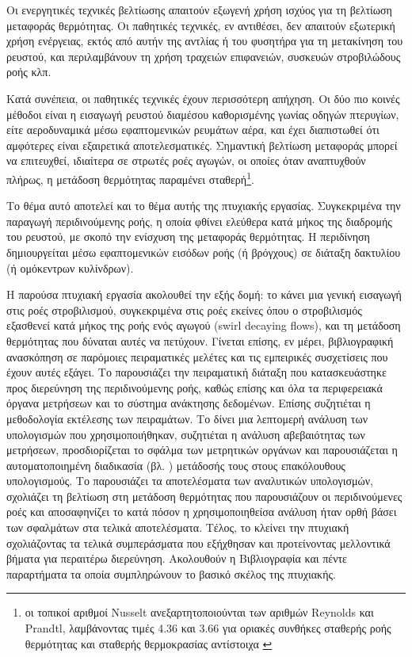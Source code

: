 Οι ενεργητικές τεχνικές βελτίωσης απαιτούν εξωγενή χρήση ισχύος για τη βελτίωση μεταφοράς θερμότητας. Οι παθητικές τεχνικές, εν αντιθέσει, δεν απαιτούν εξωτερική χρήση ενέργειας, εκτός από αυτήν της αντλίας ή του φυσητήρα για τη μετακίνηση του ρευστού, και περιλαμβάνουν τη χρήση τραχειών επιφανειών, συσκευών στροβιλώδους ροής κλπ.

Κατά συνέπεια, οι παθητικές τεχνικές έχουν περισσότερη απήχηση. Οι δύο πιο κοινές μέθοδοι είναι η εισαγωγή ρευστού διαμέσου καθορισμένης γωνίας οδηγών πτερυγίων, είτε αεροδυναμικά μέσω εφαπτομενικών ρευμάτων αέρα, και έχει διαπιστωθεί ότι αμφότερες είναι εξαιρετικά αποτελεσματικές. Σημαντική βελτίωση μεταφοράς μπορεί να επιτευχθεί, ιδιαίτερα σε στρωτές ροές αγωγών, οι οποίες όταν αναπτυχθούν πλήρως, η μετάδοση θερμότητας παραμένει σταθερή\footnote{οι τοπικοί αριθμοί Nusselt ανεξαρτητοποιούνται των αριθμών Reynolds και Prandtl, λαμβάνοντας τιμές 4.36 και 3.66 για οριακές συνθήκες σταθερής ροής θερμότητας και σταθερής θερμοκρασίας αντίστοιχα \parencites{2011_Bergman_BOOK}{2011_Lienhard_BOOK}}.

Το θέμα αυτό αποτελεί και το θέμα αυτής της πτυχιακής εργασίας. Συγκεκριμένα την παραγωγή περιδινούμενης ροής, η οποία φθίνει ελεύθερα κατά μήκος της διαδρομής του ρευστού, με σκοπό την ενίσχυση της μεταφοράς θερμότητας. Η περιδίνηση δημιουργείται μέσω εφαπτομενικών εισόδων ροής (ή βρόγχους) σε διάταξη δακτυλίου (ή ομόκεντρων κυλίνδρων).

Η παρούσα πτυχιακή εργασία ακολουθεί την εξής δομή: το \textbf{} κάνει μια γενική εισαγωγή στις ροές στροβιλισμού, συγκεκριμένα στις ροές εκείνες όπου ο στροβιλισμός εξασθενεί κατά μήκος της ροής ενός αγωγού (swirl decaying flows), και τη μετάδοση θερμότητας που δύναται αυτές να πετύχουν. Γίνεται επίσης, εν μέρει, βιβλιογραφική ανασκόπηση σε παρόμοιες πειραματικές μελέτες και τις εμπειρικές συσχετίσεις που έχουν αυτές εξάγει. Το \textbf{} παρουσιάζει την πειραματική διάταξη που κατασκευάστηκε προς διερεύνηση της περιδινούμενης ροής, καθώς επίσης και όλα τα περιφερειακά όργανα μετρήσεων και το σύστημα ανάκτησης δεδομένων. Επίσης συζητιέται η μεθοδολογία εκτέλεσης των πειραμάτων. Το \textbf{} δίνει μια λεπτομερή ανάλυση των υπολογισμών που χρησιμοποιήθηκαν, συζητιέται η ανάλυση αβεβαιότητας των μετρήσεων, προσδιορίζεται το σφάλμα των μετρητικών οργάνων και παρουσιάζεται η αυτοματοποιημένη διαδικασία (βλ. ) μετάδοσής τους στους επακόλουθους υπολογισμούς. Το \textbf{} παρουσιάζει τα αποτελέσματα των αναλυτικών υπολογισμών, σχολιάζει τη βελτίωση στη μετάδοση θερμότητας που παρουσιάζουν οι περιδινούμενες ροές και αποσαφηνίζει το κατά πόσον η χρησιμοποιηθείσα ανάλυση ήταν ορθή βάσει των σφαλμάτων στα τελικά αποτελέσματα. Τέλος, το \textbf{} κλείνει την πτυχιακή σχολιάζοντας τα τελικά συμπεράσματα που εξήχθησαν και προτείνοντας μελλοντικά βήματα για περαιτέρω διερεύνηση. Ακολουθούν η Βιβλιογραφία και πέντε παραρτήματα τα οποία συμπληρώνουν το βασικό σκέλος της πτυχιακής.